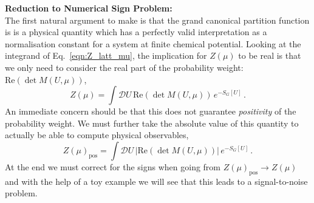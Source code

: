 \documentclass[11pt]{article}
\theoremstyle{definition}
\begin{document}
\noindent\textbf{Reduction to Numerical Sign Problem:} \\
The first natural argument to make is that the grand canonical partition function is is a physical quantity which has a perfectly valid interpretation as a normalisation constant for a system at finite chemical potential. Looking at the integrand of Eq.~\ref{eqn:Z_latt_mu}, the implication for $Z(\mu)$ to be real is that we only need to consider the real part of the probability weight: $\mathrm{Re} \left( \det M(U,\mu) \right)$,
\begin{equation}\label{eqn:Re_Z_latt_mu}
    Z(\mu) = \int \mathcal{D}U \, \mathrm{Re} \left( \det M(U,\mu) \right) \, e^{-S_G[U]} \,.
\end{equation}
An immediate concern should be that this does not guarantee \textit{positivity} of the probability weight. We must further take the absolute value of this quantity to actually be able to compute physical observables,
\begin{equation}\label{eqn:absRe_Z_latt_mu}
    Z(\mu)_{\mathrm{pos}} = \int \mathcal{D}U \, |\mathrm{Re} \left( \det M(U,\mu) \right)| \, e^{-S_G[U]} \,.
\end{equation}
At the end we must correct for the signs when going from $Z(\mu)_{\mathrm{pos}} \to Z(\mu)$ and with the help of a toy example we will see that this leads to a signal-to-noise problem.  \\
\end{document}
